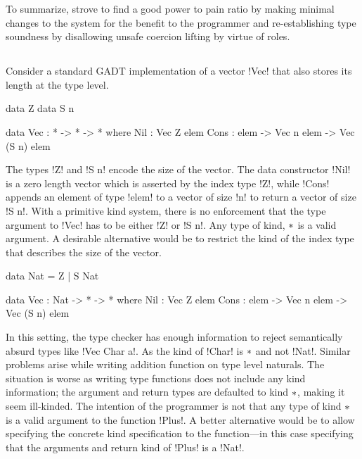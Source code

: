 \documentclass[screen,nonacm]{acmart}
\begin{document}
To summarize, \SFR strove to find a good power to pain ratio by making minimal changes to the system for the benefit to the programmer and re-establishing type soundness by disallowing unsafe coercion lifting by virtue of roles.

\subsection{\SFP}\label{sec:sfp} %
Consider a standard GADT implementation of a vector !Vec! that also stores its length at the type level.

\begin{minipage}[ht]{0.4\linewidth}
\begin{code}
        data Z
        data S n
\end{code}
\end{minipage}%
\begin{minipage}[ht]{0.4\linewidth}
\begin{code}
    data Vec : * -> * -> * where
       Nil : Vec Z elem
       Cons : elem -> Vec n elem -> Vec (S n) elem
\end{code}
\end{minipage}

The types !Z! and !S n! encode the size of the vector. The data
constructor !Nil! is a zero length vector which is asserted by the
index type !Z!, while !Cons! appends an element of type !elem! to a
vector of size !n! to return a vector of size !S n!. With a primitive
kind system, there is no enforcement that the type argument to !Vec!
has to be either !Z! or !S n!. Any type of kind, $\ast$ is a valid
argument. A desirable alternative would be to restrict the kind
of the index type that describes the size of the vector.

\begin{minipage}[ht]{0.4\linewidth}
\begin{code}
         data Nat = Z | S Nat
\end{code}
\end{minipage}%
\begin{minipage}[ht]{0.4\linewidth}
\begin{code}
     data Vec : Nat -> * -> * where
        Nil : Vec Z elem
        Cons : elem -> Vec n elem -> Vec (S n) elem
\end{code}
\end{minipage}

In this setting, the type checker has enough information to reject
semantically absurd types like !Vec Char a!. As the kind of !Char! is
$\ast$ and not !Nat!. Similar problems arise while writing addition function on type level
naturals. The situation is worse as writing type functions does not
include any kind information; the argument and return types are
defaulted to kind $\ast$, making it seem ill-kinded. The intention of
the programmer is not that any type of kind $\ast$ is a valid
argument to the function !Plus!. A better alternative would be to
allow specifying the concrete kind specification to the function---in
this case specifying that the arguments and return kind of !Plus! is a
!Nat!.
\end{document}
